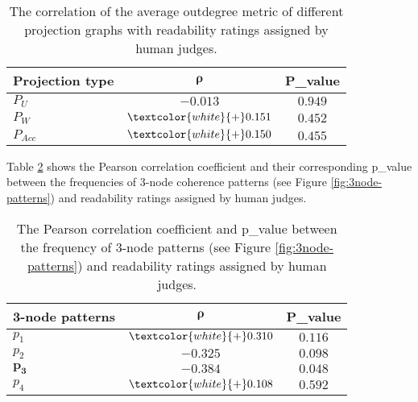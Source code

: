 \begin{table}[!ht]
	\begin{center}
		\begin{tabular}{lcc}
			\toprule
 			\textbf{Projection type}& $\boldsymbol\rho$  & \textbf{P\_value}\\
 			\midrule
			$P_U$ 				& $-0.013$ 						& $0.949$ \\
			$P_W$ 				& $\textcolor{white}{+}0.151$  	& $0.452$ \\
			$P_{Acc}$ 			& $\textcolor{white}{+}0.150$ 	& $0.455$ \\
			\bottomrule
		\end{tabular}
	\end{center}
	\caption{The correlation of the average outdegree metric of different projection graphs with readability ratings assigned by human judges.}
 	\label{tab:correlation-outdegree}
\end{table}


Table \ref{tab:correlation-3node} shows the Pearson correlation coefficient and their corresponding p\_value between the frequencies of 3-node coherence patterns (see Figure \ref{fig:3node-patterns}) and readability ratings assigned by human judges. 

\begin{table}[!ht]
	\begin{center}
		\begin{tabular}{lcc}
		\toprule
  	 	\textbf{3-node patterns} & $\boldsymbol\rho$ 		& \textbf{P\_value}	 \\
  	 	\midrule
 		$p_1$ 			& $\textcolor{white}{+}0.310$ & $0.116$ 		\\
 		$p_2$ 			& $-0.325$ 				      & $0.098$ 		\\
		$\mathbf{p_3}$ 	& $\mathbf{-0.384}$ 		  & $\mathbf{0.048}$\\
 		$p_4$ 			& $\textcolor{white}{+}0.108$ & $0.592$			\\
 		\bottomrule
		\end{tabular}
	\end{center}
	\caption{The Pearson correlation coefficient and p\_value between the frequency of \mbox{3-node} patterns (see Figure \ref{fig:3node-patterns}) and readability ratings assigned by human judges.} 
 	\label{tab:correlation-3node}
\end{table}

